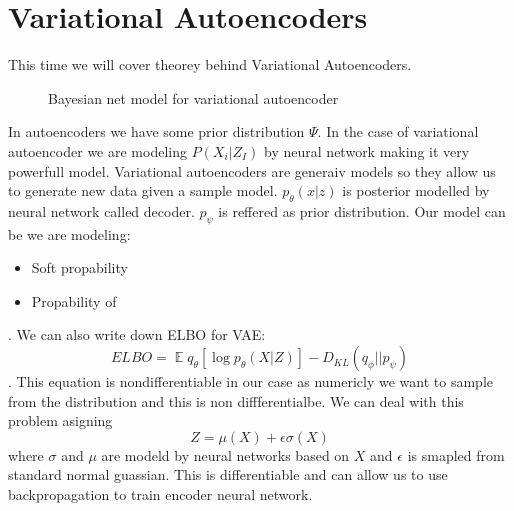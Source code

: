 \documentclass[12pt,a4paper]{article}
\DeclareMathOperator{\EX}{\mathbb{E}}%
\begin{document}
\section{Variational Autoencoders}
This time we will cover theorey behind Variational Autoencoders.
\begin{figure}[H]\label{var_enc}
    \centering
    \caption{Bayesian net model for variational autoencoder}
\end{figure}
In autoencoders we have some prior distribution $\Psi$. In the case of variational autoencoder we are modeling $P(X_i|Z_I)$ by neural network making it very powerfull model. Variational autoencoders
are generaiv models so they allow us to generate new data given a sample model. $p_\theta(x|z)$ is posterior modelled by neural network called  decoder. $p_\psi$ is reffered as
prior distribution.
Our model can be we are modeling:
\begin{itemize}
    \item Soft propability 
    \item Propability of 
\end{itemize}. We can also write down ELBO for VAE:
\begin{equation}
ELBO=\EX{q_\theta} [\log{p_\theta(X|Z)}]-D_{KL}(q_\phi||p_\psi)
\end{equation}. This equation is nondifferentiable in our case as numericly we want to sample from the distribution and this is non diffferentialbe. We can deal with this problem
asigning 
\begin{equation}
    Z=\mu(X)+\epsilon \sigma(X)
\end{equation}
where $\sigma$ and $\mu$ are modeld by neural networks based on $X$ and $\epsilon$ is smapled from standard normal guassian. This is differentiable and can allow us to use backpropagation to 
train encoder neural network.
\end{document}

